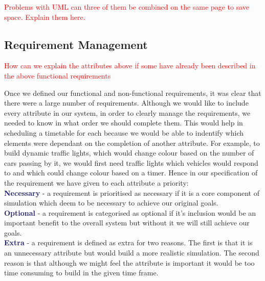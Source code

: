 \documentclass{article}
\begin{document}
\textcolor{red}{Problems with UML can three of them be combined on the same page to save space. Explain them here.}

\subsection{Requirement Management}\label{Requirement Management}
\textcolor{red}{How can we explain the attributes above if some have already been described in the above functional requirements\\
}

Once we defined our functional and non-functional requirements, it was clear that there were a large number of requirements. Although we would like to include every attribute in our system, in order to clearly manage the requirements, we needed to know in what order we should complete them. This would help in scheduling a timetable for each because we would be able to indentify which elements were dependant on the completion of another attribute. For example, to build dynamic traffic lights, which would change colour based on the number of cars passing by it, we would first need traffic lights which vehicles would respond to and which could change colour based on a timer. 
Hence in our specification of the requirement we have given to each attribute a priority:\\

\noindent
\textcolor{MidnightBlue}{\bf Necessary}
- a requirement is prioritised as necessary if it is a core component of simulation which deem to be necessary to achieve our original goals.\\

\noindent
\textcolor{MidnightBlue}{\bf Optional} - a requirement is categorised as optional if it's inclusion would be an important benefit to the overall system but without it we will still achieve our goals.\\

\noindent
\textcolor{MidnightBlue}{\bf Extra} - a requirement is defined as extra for two reasons. The first is that it is an unnecessary attribute but would build a more realistic simulation. The second reason is that although we might feel the attribute is important it would be too time consuming to build in the given time frame.\\\\
\end{document}
